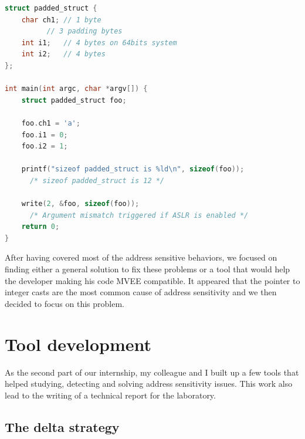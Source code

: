 \documentclass[english]{enstaPRE}
\begin{document}
\begin{lstlisting}[frame=single, caption=Writing a padded structure, label=lst:padstruct, language=C]
struct padded_struct {
    char ch1; // 1 byte
	      // 3 padding bytes
    int i1;   // 4 bytes on 64bits system
    int i2;   // 4 bytes
};

int main(int argc, char *argv[]) {
    struct padded_struct foo;
    
    foo.ch1 = 'a';
    foo.i1 = 0;
    foo.i2 = 1;
    
    printf("sizeof padded_struct is %ld\n", sizeof(foo)); 
      /* sizeof padded_struct is 12 */
    
    write(2, &foo, sizeof(foo));
      /* Argument mismatch triggered if ASLR is enabled */
    return 0;
}
\end{lstlisting}





After having covered most of the address sensitive behaviors, we focused on finding either a general solution to fix these 
problems or a tool that would help the developer making his code MVEE compatible.
It appeared that the pointer to integer casts are the most common cause of address sensitivity and we then decided to focus on this 
problem.

\chapter{Tool development}

As the second part of our internship, my colleague and I built up a few tools that helped studying, detecting and solving address
sensitivity issues. This work also lead to the writing of a technical report for the laboratory.

\section{The delta strategy}
\end{document}

